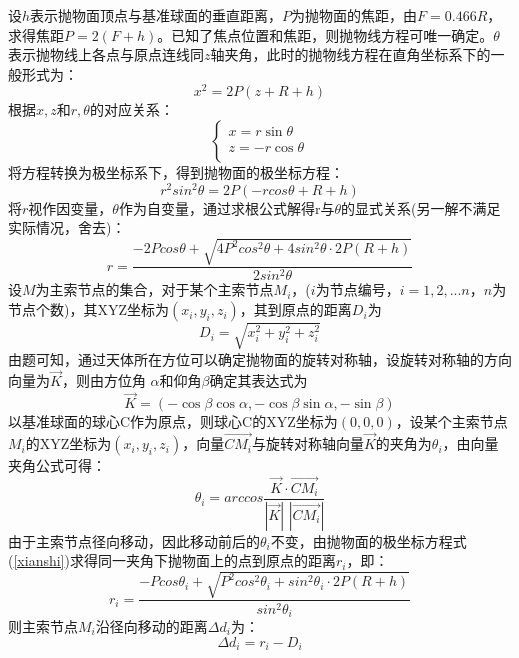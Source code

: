 \documentclass[withoutpreface,bwprint]{cumcmthesis} %
\begin{document}
		设$h$表示抛物面顶点与基准球面的垂直距离，$P$为抛物面的焦距，由$F=0.466R$，求得焦距$P=2(F+h)$。已知了焦点位置和焦距，则抛物线方程可唯一确定。$\theta$表示抛物线上各点与原点连线同$z$轴夹角，此时的抛物线方程在直角坐标系下的一般形式为：
		\begin{equation}\label{basic}
			x^2=2P(z+R+h)
		\end{equation}
		根据$x,z$和$r,\theta$的对应关系：
		\begin{equation}\label{xzr}
		\left\{ \begin{array}{c}
		x=r\sin \theta\\
		z=-r\cos \theta\\
		\end{array} \right. 
		\end{equation}
		将方程转换为极坐标系下，得到抛物面的极坐标方程：
		\begin{equation}\label{jizuobiao}
			r^2sin^2\theta=2P(-rcos\theta+R+h)
		\end{equation}
		将$r$视作因变量，$\theta$作为自变量，通过求根公式解得r与$\theta$的显式关系(另一解不满足实际情况，舍去)：
		\begin{equation}\label{xianshi}
			r=\frac{-2Pcos\theta + \sqrt{4P^2cos^2\theta+4sin^2\theta\cdot 2P(R+h)}}{2sin^2\theta}
		\end{equation}
		设$M$为主索节点的集合，对于某个主索节点$M_i$，($i$为节点编号，$i=1,2,... n$，$n$为节点个数)，其XYZ坐标为$(x_i,y_i,z_i)$，其到原点的距离$D_i$为
		\begin{equation}\label{key}
		D_i=\sqrt{x_i^2+y_i^2+z_i^2}
		\end{equation}
		由题可知，通过天体所在方位可以确定抛物面的旋转对称轴，设旋转对称轴的方向向量为$\vec{K}$，则由方位角 $\alpha$和仰角$\beta$确定其表达式为
		\begin{equation}\label{K}
		\vec{K}=\left( -\cos \beta \cos \alpha ,-\cos \beta \sin \alpha ,-\sin \beta \right) 
		\end{equation}
		以基准球面的球心C作为原点，则球心C的XYZ坐标为$(0,0,0)$，设某个主索节点$M_i$的XYZ坐标为$(x_i,y_i,z_i)$，向量$\vec{CM_i}$与旋转对称轴向量$\vec{K}$的夹角为$\theta_i$，由向量夹角公式可得：
		\begin{equation}\label{costheta}
		\theta_i =arccos \frac{\overrightarrow{K}\cdot \overrightarrow{CM_i}}{\left| \overrightarrow{K} \right|\,\,\left| \overrightarrow{CM_i} \right|}
		\end{equation}
		由于主索节点径向移动，因此移动前后的$\theta_i$不变，由抛物面的极坐标方程式(\ref{xianshi})求得同一夹角下抛物面上的点到原点的距离$r_i$，即：
		\begin{equation}\label{xianshi2}
		r_i=\frac{-Pcos\theta_i + \sqrt{P^2cos^2\theta_i+sin^2\theta_i\cdot 2P(R+h)}}{sin^2\theta_i}
		\end{equation}
		则主索节点$M_i$沿径向移动的距离$\Delta d_i$为：
		\begin{equation}\label{Deltad}
		\Delta d_i=r_i-D_i
		\end{equation}
\end{document}

